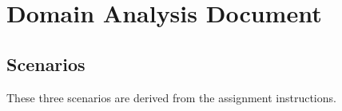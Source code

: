 %
%
%


\section{Domain Analysis Document}
% 


\subsection{Scenarios}
These three scenarios are derived from the assignment instructions. \cite{2dv603:assignment1-instructions}


